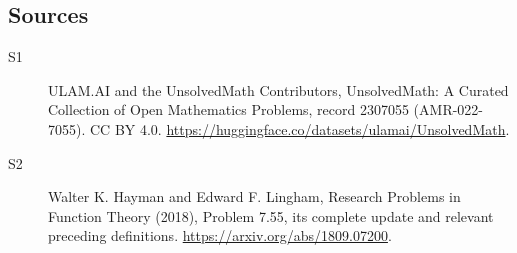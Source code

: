 \documentclass[11pt]{article}
\begin{document}
\subsection{Sources}
\begin{description}
\item[\hypertarget{source:2307055:1}{S1}] ULAM.AI and the UnsolvedMath Contributors, UnsolvedMath: A Curated Collection of Open Mathematics Problems, record 2307055 (AMR-022-7055). CC BY 4.0. \url{https://huggingface.co/datasets/ulamai/UnsolvedMath}.
\item[\hypertarget{source:2307055:2}{S2}] Walter K. Hayman and Edward F. Lingham, Research Problems in Function Theory (2018), Problem 7.55, its complete update and relevant preceding definitions. \url{https://arxiv.org/abs/1809.07200}.
\end{description}
\label{end:2307055}
\end{document}
